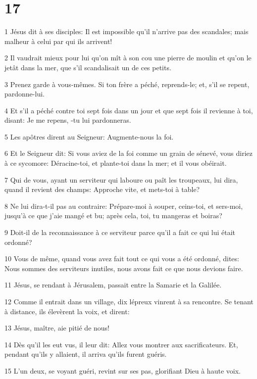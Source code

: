 \chapter{17}

\par 1 Jésus dit à ses disciples: Il est impossible qu'il n'arrive pas des scandales; mais malheur à celui par qui ils arrivent!
\par 2 Il vaudrait mieux pour lui qu'on mît à son cou une pierre de moulin et qu'on le jetât dans la mer, que s'il scandalisait un de ces petits.
\par 3 Prenez garde à vous-mêmes. Si ton frère a péché, reprends-le; et, s'il se repent, pardonne-lui.
\par 4 Et s'il a péché contre toi sept fois dans un jour et que sept fois il revienne à toi, disant: Je me repens, -tu lui pardonneras.
\par 5 Les apôtres dirent au Seigneur: Augmente-nous la foi.
\par 6 Et le Seigneur dit: Si vous aviez de la foi comme un grain de sénevé, vous diriez à ce sycomore: Déracine-toi, et plante-toi dans la mer; et il vous obéirait.
\par 7 Qui de vous, ayant un serviteur qui laboure ou paît les troupeaux, lui dira, quand il revient des champs: Approche vite, et mets-toi à table?
\par 8 Ne lui dira-t-il pas au contraire: Prépare-moi à souper, ceins-toi, et sers-moi, jusqu'à ce que j'aie mangé et bu; après cela, toi, tu mangeras et boiras?
\par 9 Doit-il de la reconnaissance à ce serviteur parce qu'il a fait ce qui lui était ordonné?
\par 10 Vous de même, quand vous avez fait tout ce qui vous a été ordonné, dites: Nous sommes des serviteurs inutiles, nous avons fait ce que nous devions faire.
\par 11 Jésus, se rendant à Jérusalem, passait entre la Samarie et la Galilée.
\par 12 Comme il entrait dans un village, dix lépreux vinrent à sa rencontre. Se tenant à distance, ils élevèrent la voix, et dirent:
\par 13 Jésus, maître, aie pitié de nous!
\par 14 Dès qu'il les eut vus, il leur dit: Allez vous montrer aux sacrificateurs. Et, pendant qu'ils y allaient, il arriva qu'ils furent guéris.
\par 15 L'un deux, se voyant guéri, revint sur ses pas, glorifiant Dieu à haute voix.
